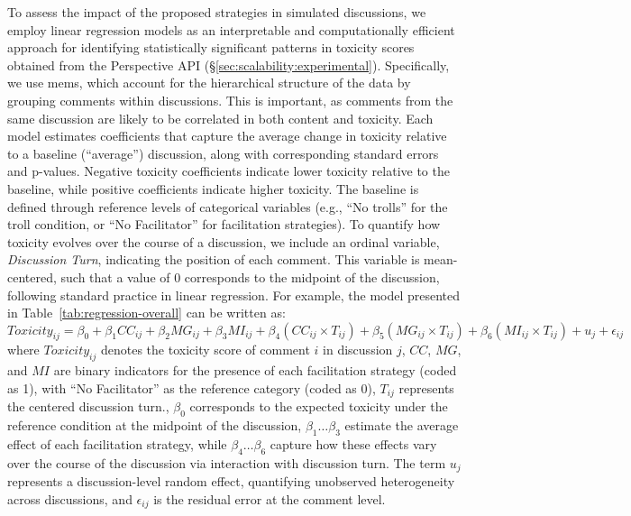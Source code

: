 To assess the impact of the proposed strategies in simulated discussions, we employ linear regression models as an interpretable and computationally efficient approach for identifying statistically significant patterns in toxicity scores obtained from the Perspective API (\S\ref{sec:scalability:experimental}). Specifically, we use \acp{mem}, which account for the hierarchical structure of the data by grouping comments within discussions. This is important, as comments from the same discussion are likely to be correlated in both content and toxicity. Each model estimates coefficients that capture the average change in toxicity relative to a baseline (``average'') discussion, along with corresponding standard errors and p-values.  Negative toxicity coefficients indicate lower toxicity relative to the baseline, while positive coefficients indicate higher toxicity. The baseline is defined through reference levels of categorical variables (e.g., ``No trolls'' for the troll condition, or ``No Facilitator'' for facilitation strategies). To quantify how toxicity evolves over the course of a discussion, we include an ordinal variable, \textit{Discussion Turn}, indicating the position of each comment. This variable is mean-centered, such that a value of 0 corresponds to the midpoint of the discussion, following standard practice in linear regression. For example, the model presented in Table~\ref{tab:regression-overall} can be written as:
\[
\textit{Toxicity}_{ij} = \beta_0 + \beta_1 CC_{ij} + \beta_2 MG_{ij} + \beta_3 MI_{ij}
+ \beta_4 (CC_{ij} \times T_{ij}) + \beta_5 (MG_{ij} \times T_{ij}) + \beta_6 (MI_{ij} \times T_{ij})
+ u_j + \epsilon_{ij}
\]
\noindent where $\textit{Toxicity}_{ij}$ denotes the toxicity score of comment $i$ in discussion $j$, $CC$, $MG$, and $MI$ are binary indicators for the presence of each facilitation strategy (coded as 1), with “No Facilitator” as the reference category (coded as 0), $T_{ij}$ represents the centered discussion turn., $\beta_0$ corresponds to the expected toxicity under the reference condition at the midpoint of the discussion,
$\beta_1 \ldots \beta_3$ estimate the average effect of each facilitation strategy, while $\beta_4 \ldots \beta_6$ capture how these effects vary over the course of the discussion via interaction with discussion turn. The term $u_j$ represents a discussion-level random effect, quantifying unobserved heterogeneity across discussions, and $\epsilon_{ij}$ is the residual error at the comment level.


